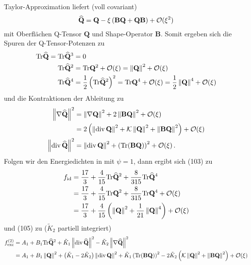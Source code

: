\documentclass[a4paper,11pt]{scrartcl}
\newcommand{\Tr}{\text{Tr}}
\newcommand{\landau}{\mathcal{O}}
\newcommand{\Qb}{\mathbf{Q}}
\newcommand{\QExt}{\extend{\Qb}}
\newcommand{\Bb}{\mathbf{B}}
\begin{document}
Taylor-Approximation liefert (voll covariant)
\begin{align}
  \QExt = \Qb - \xi \left( \Bb\Qb + \Qb\Bb \right) + \landau(\xi^{2})
\end{align}
mit Oberflächen Q-Tensor \( \Qb \) und Shape-Operator \( \Bb \).
Somit ergeben sich die Spuren der Q-Tensor-Potenzen zu
\begin{align}
  \Tr\QExt = \Tr\QExt^{3} &= 0\\
  \Tr\QExt^{2} &= \Tr\Qb^{2} + \landau(\xi) = \left\| \Qb \right\|^{2} + \landau(\xi) \\
  \Tr\QExt^{4} &= \frac{1}{2}\left( \Tr\QExt^{2} \right)^{2} = \Tr\Qb^{4} + \landau(\xi) = \frac{1}{2}\left\| \Qb \right\|^{4} + \landau(\xi)
\end{align}
und die Kontraktionen der Ableitung zu
\begin{align}
  \left\| \nabla\QExt \right\|^{2} &= \left\| \nabla\Qb \right\|^{2} + 2\left\| \Bb\Qb \right\|^{2} + \landau(\xi) \\
                                   &= 2\left( \left\| \div\Qb \right\|^{2} + \gaussianCurvature\left\| \Qb \right\|^{2} + \left\| \Bb\Qb \right\|^{2}\right) + \landau(\xi) \\
  \left\| \div\QExt \right\|^{2} &= \left\| \div\Qb \right\|^{2} + \left( \Tr(\Bb\Qb) \right)^{2} + \landau(\xi) \formPeriod
\end{align}
Folgen wir den Energiedichten in \cite{Emmerich2012}
mit \( \psi = 1 \),
dann ergibt sich (103) zu
\begin{align}
  f_{\textup{id}} &= \frac{17}{3} + \frac{4}{15} \Tr\QExt^{2} + \frac{8}{315}\Tr\QExt^{4} \\
                  &= \frac{17}{3} + \frac{4}{15} \Tr\Qb^{2} + \frac{8}{315}\Tr\Qb^{4} + \landau(\xi) \\
                  &= \frac{17}{3} + \frac{4}{15}\left( \left\| \Qb \right\|^{2} + \frac{1}{21}\left\| \Qb \right\|^{4} \right) + \landau(\xi)
\end{align}
und (105) zu (\(\tilde{K}_{2}\) partiell integriert)
\begin{align}
  f_{\textup{exc}}^{(2)} &= A_{1} + B_{1}\Tr\QExt^{2} + \tilde{K}_{1}\left\| \div\QExt \right\|^{2} - \tilde{K}_{2}\left\| \nabla\QExt \right\|^{2} \\
                         &= A_{1} + B_{1}\left\| \Qb \right\|^{2} + \left( \tilde{K}_{1} - 2\tilde{K}_{2} \right)\left\| \div\Qb \right\|^{2}
                              + \tilde{K}_{1}\left( \Tr(\Bb\Qb) \right)^{2} - 2\tilde{K}_{2}\left( \gaussianCurvature\left\| \Qb \right\|^{2} + \left\| \Bb\Qb \right\|^{2} \right)
                              +\landau(\xi)
\end{align}
\end{document}

